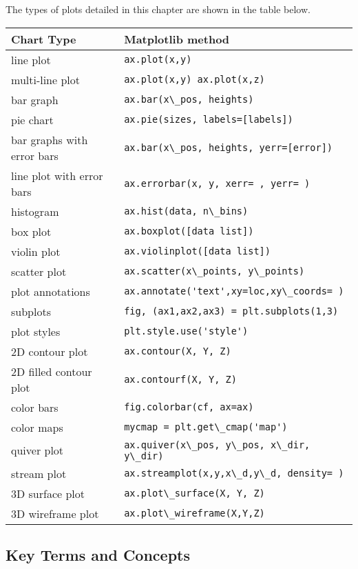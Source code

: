 \documentclass{book}
\newcommand{\passthrough}[1]{#1}
\begin{document}
The types of plots detailed in this chapter are shown in the table
below.

\begin{longtable}[]{@{}ll@{}}
\toprule
Chart Type & Matplotlib method\tabularnewline
\midrule
\endhead
line plot & \passthrough{\lstinline!ax.plot(x,y)!}\tabularnewline
multi-line plot &
\passthrough{\lstinline!ax.plot(x,y) ax.plot(x,z)!}\tabularnewline
bar graph &
\passthrough{\lstinline!ax.bar(x\_pos, heights)!}\tabularnewline
pie chart &
\passthrough{\lstinline!ax.pie(sizes, labels=[labels])!}\tabularnewline
bar graphs with error bars &
\passthrough{\lstinline!ax.bar(x\_pos, heights, yerr=[error])!}\tabularnewline
line plot with error bars &
\passthrough{\lstinline!ax.errorbar(x, y, xerr= , yerr= )!}\tabularnewline
histogram &
\passthrough{\lstinline!ax.hist(data, n\_bins)!}\tabularnewline
box plot &
\passthrough{\lstinline!ax.boxplot([data list])!}\tabularnewline
violin plot &
\passthrough{\lstinline!ax.violinplot([data list])!}\tabularnewline
scatter plot &
\passthrough{\lstinline!ax.scatter(x\_points, y\_points)!}\tabularnewline
plot annotations &
\passthrough{\lstinline!ax.annotate('text',xy=loc,xy\_coords= )!}\tabularnewline
subplots &
\passthrough{\lstinline!fig, (ax1,ax2,ax3) = plt.subplots(1,3)!}\tabularnewline
plot styles &
\passthrough{\lstinline!plt.style.use('style')!}\tabularnewline
2D contour plot &
\passthrough{\lstinline!ax.contour(X, Y, Z)!}\tabularnewline
2D filled contour plot &
\passthrough{\lstinline!ax.contourf(X, Y, Z)!}\tabularnewline
color bars &
\passthrough{\lstinline!fig.colorbar(cf, ax=ax)!}\tabularnewline
color maps &
\passthrough{\lstinline!mycmap = plt.get\_cmap('map')!}\tabularnewline
quiver plot &
\passthrough{\lstinline!ax.quiver(x\_pos, y\_pos, x\_dir, y\_dir)!}\tabularnewline
stream plot &
\passthrough{\lstinline!ax.streamplot(x,y,x\_d,y\_d, density= )!}\tabularnewline
3D surface plot &
\passthrough{\lstinline!ax.plot\_surface(X, Y, Z)!}\tabularnewline
3D wireframe plot &
\passthrough{\lstinline!ax.plot\_wireframe(X,Y,Z)!}\tabularnewline
\bottomrule
\end{longtable}
    




    
        \hypertarget{key-terms-and-concepts}{%
\subsection{Key Terms and Concepts}\label{key-terms-and-concepts}}
    
\end{document}
